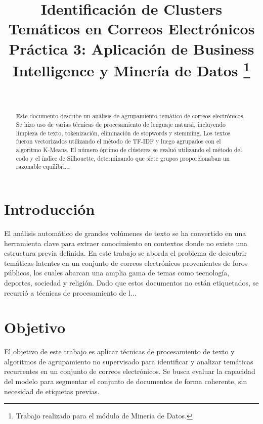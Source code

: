\documentclass[journal]{IEEEtran}
\begin{document}
\title{Identificación de Clusters Temáticos en Correos Electrónicos\\
{\footnotesize Práctica 3: Aplicación de Business Intelligence y Minería de Datos}
\thanks{Trabajo realizado para el módulo de Minería de Datos.}
}

\author{
    \\
}

\maketitle

\begin{abstract}
Este documento describe un análisis de agrupamiento temático de correos electrónicos. Se hizo uso de varias técnicas de procesamiento de lenguaje natural, incluyendo limpieza de texto, tokenización, eliminación de stopwords y stemming. Los textos fueron vectorizados utilizando el método de TF-IDF y luego agrupados con el algoritmo K-Means. El número óptimo de clústeres se evaluó utilizando el método del codo y el índice de Silhouette, determinando que siete grupos proporcionaban un razonable equilibri...
\end{abstract}

\section{Introducción}
El análisis automático de grandes volúmenes de texto se ha convertido en una herramienta clave para extraer conocimiento en contextos donde no existe una estructura previa definida. En este trabajo se aborda el problema de descubrir temáticas latentes en un conjunto de correos electrónicos provenientes de foros públicos, los cuales abarcan una amplia gama de temas como tecnología, deportes, sociedad y religión. Dado que estos documentos no están etiquetados, se recurrió a técnicas de procesamiento de l...

\section{Objetivo}
El objetivo de este trabajo es aplicar técnicas de procesamiento de texto y algoritmos de agrupamiento no supervisado para identificar y analizar temáticas recurrentes en un conjunto de correos electrónicos. Se busca evaluar la capacidad del modelo para segmentar el conjunto de documentos de forma coherente, sin necesidad de etiquetas previas.
\end{document}
